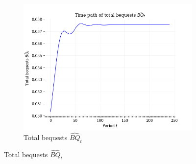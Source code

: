 \documentclass[letterpaper,12pt]{article}
\theoremstyle{definition}
\begin{document}
\begin{figure}[htbp]
      \begin{subfigure}[b]{0.4\textwidth}
        \includegraphics[width=\textwidth]{images/TP_BQ_path.png}
        \caption{Total bequests $\hat{BQ}_t$}
        \label{FigTPrwBQ_BQ}
      \end{subfigure}
    \end{figure}
\end{document}
